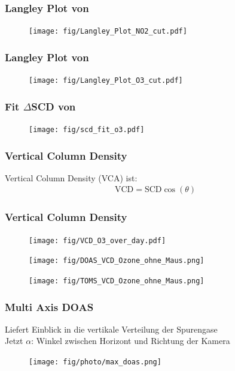 \documentclass{beamer}
\begin{document}
\begin{frame}
    \frametitle{Langley Plot von }
    \begin{figure}
    \texttt{[image: fig/Langley\_Plot\_NO2\_cut.pdf]}
    \end{figure}
\end{frame}

\begin{frame}
    \frametitle{Langley Plot von }
    \begin{figure}
    \texttt{[image: fig/Langley\_Plot\_O3\_cut.pdf]}
    \end{figure}
\end{frame}

\begin{frame}
    \frametitle{Fit $\Delta$SCD von }
    \begin{figure}
    \texttt{[image: fig/scd\_fit\_o3.pdf]}
    \end{figure}
\end{frame}

\begin{frame}
    \frametitle{Vertical Column Density }
    Vertical Column Density (VCA) ist:
    \begin{align}
        \text{VCD} = \text{SCD} \cos (\theta)
    \end{align}
\end{frame} 

\begin{frame}
    \frametitle{Vertical Column Density }
    \begin{figure}
    \texttt{[image: fig/VCD\_O3\_over\_day.pdf]}
    \end{figure}
\end{frame}

\begin{frame}
    \begin{figure}
    \texttt{[image: fig/DOAS\_VCD\_Ozone\_ohne\_Maus.png]}
    \end{figure}

    \begin{figure}
    \texttt{[image: fig/TOMS\_VCD\_Ozone\_ohne\_Maus.png]}
    \end{figure}
\end{frame}

\begin{frame}
    \frametitle{Multi Axis DOAS}
    Liefert Einblick in die vertikale Verteilung der Spurengase \\
    Jetzt $\alpha$: Winkel zwischen Horizont und Richtung der Kamera
    \begin{figure}
        \texttt{[image: fig/photo/max\_doas.png]}
    \end{figure}
\end{frame}
\end{document}
